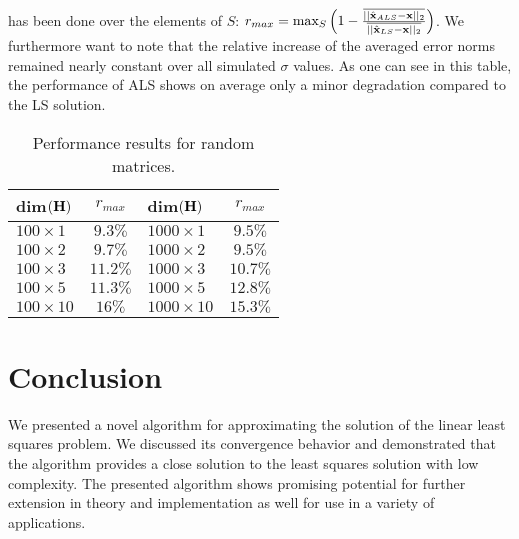 \documentclass{article}
\begin{document}
has been done over the elements of $S$: 
$r_{max} = \text{max}_S \left(1-\frac{\overline{||\hat{\bf x}_{ALS}-{\bf x}||_2}}{\overline{||\hat{\bf x}_{LS}-{\bf x}||_2}} \right)$. 
We furthermore want to note that 
the relative increase of the averaged
error norms remained nearly constant over all simulated $\sigma$ values.
As one can see in this table, the performance of ALS shows on average only a minor degradation 
compared to the LS solution.
\begin{table}[htb]
\centering
\begin{tabular}{|l|c||l|c|}
\hline
dim$({\bf H})$ & $r_{max}$ & dim$({\bf H})$ & $r_{max}$ \\
\hline
$100  \times 1$   & $9.3\%$  & $1000 \times 1$   & $9.5\%$ \\
$100  \times 2$   & $9.7\%$  & $1000 \times 2$   & $9.5\%$ \\
$100  \times 3$   & $11.2\%$ & $1000 \times 3$   & $10.7\%$\\
$100  \times 5$   & $11.3\%$ & $1000 \times 5$   & $12.8\%$\\
$100  \times 10$  & $16\%$   & $1000 \times 10$  & $15.3\%$\\    
\hline
\end{tabular}
\caption{Performance results for random matrices. \label{tab:perf_res} }
\end{table}
\section{Conclusion} \label{sec:sim_res}
We presented a novel algorithm for 
approximating the solution of the linear least squares problem. We discussed its 
convergence behavior and
demonstrated that the algorithm provides a close solution to the least squares solution
with low complexity. The presented algorithm 
shows promising potential for further extension in theory and implementation as well 
for use in a variety of applications.


\vfill\pagebreak
\end{document}
